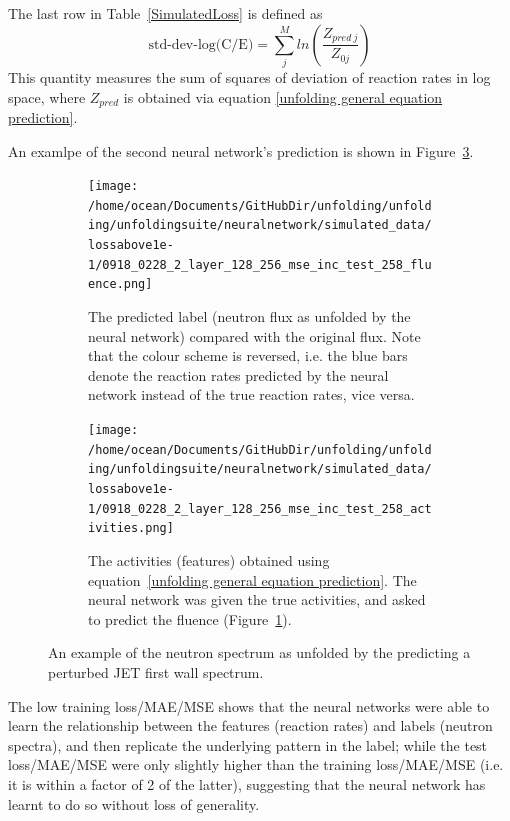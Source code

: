 \documentclass[a4paper, 12pt]{article}
\begin{document}
The last row in Table~\ref{SimulatedLoss} is defined as
\begin{equation}
    \text{std-dev-log(C/E)} = \sum_j^M ln\left(\frac{Z_{pred\:j}}{Z_{0j}}\right)
\end{equation}
This quantity measures the sum of squares of deviation of reaction rates in log space,
where $Z_{pred}$ is obtained via equation \ref{unfolding general equation prediction}.

An examlpe of the second neural network's prediction is shown in Figure~\ref{SimulatedExample}.

\begin{figure}
\centering
    \begin{subfigure}[b]{11cm}
    \texttt{[image: /home/ocean/Documents/GitHubDir/unfolding/unfolding/unfoldingsuite/neuralnetwork/simulated\_data/lossabove1e-1/0918\_0228\_2\_layer\_128\_256\_mse\_inc\_test\_258\_fluence.png]}
    \caption{The predicted label (neutron flux as unfolded by the neural network) compared with the original flux. Note that the colour scheme is reversed, i.e. the blue bars denote the reaction rates predicted by the neural network instead of the true reaction rates, vice versa.}\label{SimulatedFluence}
    \end{subfigure}
    \begin{subfigure}[b]{5cm}
    \texttt{[image: /home/ocean/Documents/GitHubDir/unfolding/unfolding/unfoldingsuite/neuralnetwork/simulated\_data/lossabove1e-1/0918\_0228\_2\_layer\_128\_256\_mse\_inc\_test\_258\_activities.png]}
    \caption{The activities (features) obtained using equation~\ref{unfolding general equation prediction}. The neural network was given the true activities, and asked to predict the fluence (Figure~\ref{SimulatedFluence}).}\label{SimulatedActivity}
    \end{subfigure}
\caption{An example of the neutron spectrum as unfolded by the  predicting a perturbed JET first wall spectrum.} \label{SimulatedExample}
\end{figure}

The low training loss/MAE/MSE shows that the neural networks were able to learn the relationship between the features (reaction rates) and labels (neutron spectra), and then replicate the underlying pattern in the label; while the test loss/MAE/MSE were only slightly higher than the training loss/MAE/MSE (i.e. it is within a factor of 2 of the latter), suggesting that the neural network has learnt to do so without loss of generality.
\end{document}
